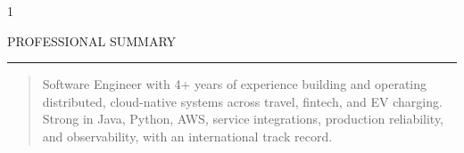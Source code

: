 \documentclass[9pt,a4paper,ragged2e,withhyper]{altacv}
\renewcommand{\cvsectionfont}{\LARGE\fontseries{eb}\selectfont}
\renewcommand{\divider}{\textcolor{body!30}{\hdashrule{\linewidth}{0.6pt}{0.5ex}}\smallskip}
\renewcommand{\cvsection}[2][]{%
  \nointerlineskip\medskip%
  \ifstrequal{#1}{}{}{\marginpar{\vspace*{\dimexpr1pt-\baselineskip}\raggedright}}%
  {\color{heading}\cvsectionfont\MakeUppercase{#2}}\\[-1ex]%
  {\color{headingrule}\rule{\linewidth}{2pt}\par}\smallskip
}
\begin{document}
    \begin{paracol}{1}

            
            
            
        
        
        
        
        
        
        
        \cvsection{Professional Summary}
            \begin{quote}\normalsize
                Software Engineer with 4+ years of experience building and operating distributed, cloud-native systems across travel, fintech, and EV charging.
                Strong in Java, Python, AWS, service integrations, production reliability, and observability, with an international track record.
            \end{quote}
        \smallskip


\end{paracol}
\end{document}
